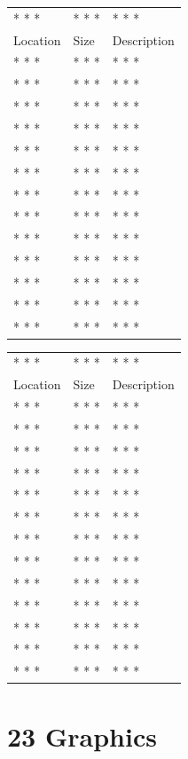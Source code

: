 \documentclass[
]{book}
\begin{document}
\begin{longtable}[]{@{}lll@{}}
\toprule()
\endhead
* * * & * * * & * * * \\
Location & Size & Description \\
* * * & * * * & * * * \\
* * * & * * * & * * * \\
* * * & * * * & * * * \\
* * * & * * * & * * * \\
* * * & * * * & * * * \\
* * * & * * * & * * * \\
* * * & * * * & * * * \\
* * * & * * * & * * * \\
* * * & * * * & * * * \\
* * * & * * * & * * * \\
* * * & * * * & * * * \\
* * * & * * * & * * * \\
* * * & * * * & * * * \\
\bottomrule()
\end{longtable}

\begin{longtable}[]{@{}lll@{}}
\toprule()
\endhead
* * * & * * * & * * * \\
Location & Size & Description \\
* * * & * * * & * * * \\
* * * & * * * & * * * \\
* * * & * * * & * * * \\
* * * & * * * & * * * \\
* * * & * * * & * * * \\
* * * & * * * & * * * \\
* * * & * * * & * * * \\
* * * & * * * & * * * \\
* * * & * * * & * * * \\
* * * & * * * & * * * \\
* * * & * * * & * * * \\
* * * & * * * & * * * \\
* * * & * * * & * * * \\
\bottomrule()
\end{longtable}

\hypertarget{graphics-1}{%
\chapter{23 Graphics}\label{graphics-1}}
\end{document}
